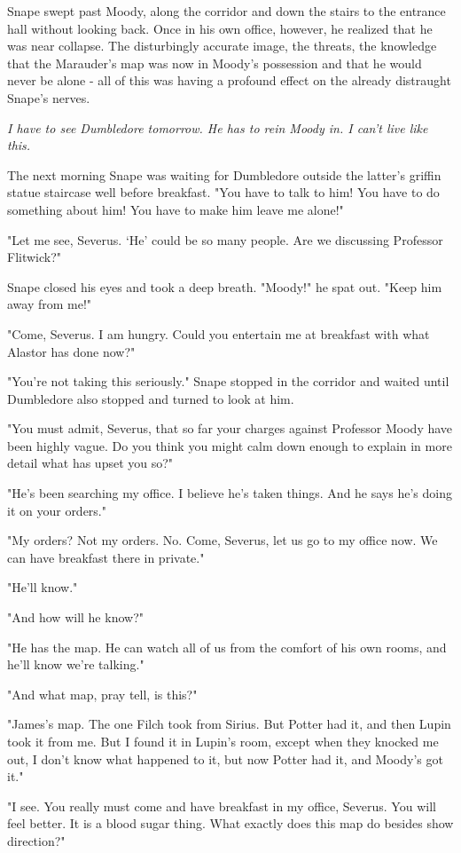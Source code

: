 \documentclass[a4paper,11pt]{article}
\begin{document}
Snape swept past Moody, along the corridor and down the stairs to the entrance hall without looking back. Once in his own office, however, he realized that he was near collapse. The disturbingly accurate image, the threats, the knowledge that the Marauder's map was now in Moody's possession and that he would never be alone - all of this was having a profound effect on the already distraught Snape's nerves.

\emph{I have to see Dumbledore tomorrow. He has to rein Moody in. I can't live like this.}

The next morning Snape was waiting for Dumbledore outside the latter's griffin statue staircase well before breakfast. "You have to talk to him! You have to do something about him! You have to make him leave me alone!"

"Let me see, Severus. `He' could be so many people. Are we discussing Professor Flitwick?"

Snape closed his eyes and took a deep breath. "Moody!" he spat out. "Keep him away from me!"

"Come, Severus. I am hungry. Could you entertain me at breakfast with what Alastor has done now?"

"You're not taking this seriously." Snape stopped in the corridor and waited until Dumbledore also stopped and turned to look at him.

"You must admit, Severus, that so far your charges against Professor Moody have been highly vague. Do you think you might calm down enough to explain in more detail what has upset you so?"

"He's been searching my office. I believe he's taken things. And he says he's doing it on your orders."

"My orders? Not my orders. No. Come, Severus, let us go to my office now. We can have breakfast there in private."

"He'll know."

"And how will he know?"

"He has the map. He can watch all of us from the comfort of his own rooms, and he'll know we're talking."

"And what map, pray tell, is this?"

"James's map. The one Filch took from Sirius. But Potter had it, and then Lupin took it from me. But I found it in Lupin's room, except when they knocked me out, I don't know what happened to it, but now Potter had it, and Moody's got it."

"I see. You really must come and have breakfast in my office, Severus. You will feel better. It is a blood sugar thing. What exactly does this map do besides show direction?"
\end{document}
